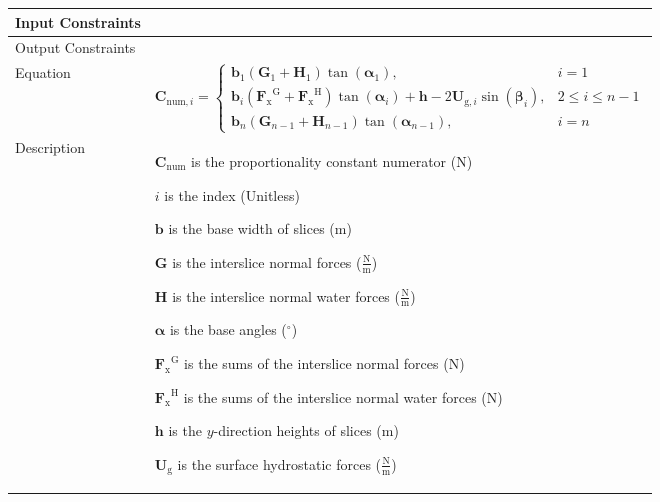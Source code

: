 \documentclass[12pt]{article}
\begin{document}
\begin{minipage}{\textwidth}
\begin{tabular}{>{\raggedright}p{}>{\raggedright\arraybackslash}p{}}
\\ \midrule
Input Constraints & 
\\ \midrule
Output Constraints & 
\\ \midrule
Equation & \begin{displaymath}
           {\symbf{C}_{\text{num},i}}=\begin{cases}
                                      {\symbf{b}}_{1} \left({\symbf{G}}_{1}+{\symbf{H}}_{1}\right) \tan\left({\symbf{α}}_{1}\right), & i=1\\
                                      {\symbf{b}}_{i} \left({{\symbf{F}_{\text{x}}}^{\text{G}}}+{{\symbf{F}_{\text{x}}}^{\text{H}}}\right) \tan\left({\symbf{α}}_{i}\right)+\symbf{h} -2 {\symbf{U}_{\text{g},i}} \sin\left({\symbf{β}}_{i}\right), & 2\leq{}i\leq{}n-1\\
                                      {\symbf{b}}_{n} \left({\symbf{G}}_{n-1}+{\symbf{H}}_{n-1}\right) \tan\left({\symbf{α}}_{n-1}\right), & i=n
                                      \end{cases}
           \end{displaymath}
\\ \midrule
Description & \begin{symbDescription}
              \item{${\symbf{C}_{\text{num}}}$ is the proportionality constant numerator (${\text{N}}$)}
              \item{$i$ is the index (Unitless)}
              \item{$\symbf{b}$ is the base width of slices (${\text{m}}$)}
              \item{$\symbf{G}$ is the interslice normal forces ($\frac{\text{N}}{\text{m}}$)}
              \item{$\symbf{H}$ is the interslice normal water forces ($\frac{\text{N}}{\text{m}}$)}
              \item{$\symbf{α}$ is the base angles (${{}^{\circ}}$)}
              \item{${{\symbf{F}_{\text{x}}}^{\text{G}}}$ is the sums of the interslice normal forces (${\text{N}}$)}
              \item{${{\symbf{F}_{\text{x}}}^{\text{H}}}$ is the sums of the interslice normal water forces (${\text{N}}$)}
              \item{$\symbf{h}$ is the $y$-direction heights of slices (${\text{m}}$)}
              \item{${\symbf{U}_{\text{g}}}$ is the surface hydrostatic forces ($\frac{\text{N}}{\text{m}}$)}

\end{symbDescription}
\end{tabular}
\end{minipage}
\end{document}
